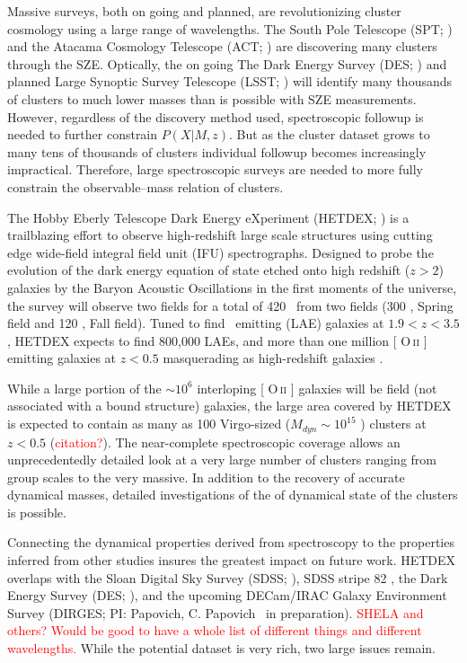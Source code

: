 \documentclass[apj, revtex4]{emulateapj}
\makeatletter
\newcommand{\editorial}[1]{\textcolor{red}{#1}}
\DeclareRobustCommand{\ion}[2]{%
\relax\ifmmode
\ifx\testbx\f@series
{\mathbf{#1\,\mathsc{#2}}}\else
{\mathrm{#1\,\mathsc{#2}}}\fi
\else\textup{#1\,{\mdseries\textsc{#2}}}%
\fi}
\makeatother
\begin{document}
Massive surveys, both on going and planned, are revolutionizing cluster cosmology using a large range of wavelengths. The South Pole Telescope (SPT; \citealt{Carlstrom2011}) and the Atacama Cosmology Telescope (ACT; \citealt{Swetz2011}) are discovering many clusters through the SZE. Optically, the on going The Dark Energy Survey (DES; \citealt{DES2005}) and planned Large Synoptic Survey Telescope (LSST; \citealt{LSST2012}) will identify many thousands of clusters to much lower masses than is possible with SZE measurements. However, regardless of the discovery method used, spectroscopic followup is needed to further constrain $P(X|M,z)$. But as the cluster dataset grows to many tens of thousands of clusters individual followup becomes increasingly impractical. Therefore, large spectroscopic surveys are needed to more fully constrain the observable--mass relation of clusters.

The Hobby Eberly Telescope Dark Energy eXperiment (HETDEX; \citealt{Hill2008}) is a trailblazing effort to observe high-redshift large scale structures using cutting edge wide-field integral field unit (IFU) spectrographs. Designed to probe the evolution of the dark energy equation of state etched onto high redshift ($z>2$) galaxies by the Baryon Acoustic Oscillations \citep{Eisenstein2005} in the first moments of the universe, the survey will observe two fields for a total of 420 \degsq\ from two fields (300 \degsq, Spring field and 120 \degsq, Fall field). Tuned to find \lya\ emitting (LAE) galaxies at $1.9<z<3.5$, HETDEX expects to find 800,000 LAEs, and more than one million [\ion{O}{ii}] emitting galaxies at $z<0.5$ masquerading as high-redshift galaxies \citep{Acquaviva2014}. 

While a large portion of the $\sim10^6$ interloping [\ion{O}{ii}] galaxies will be field (not associated with a bound structure) galaxies, the large area covered by HETDEX is expected to contain as many as 100 Virgo-sized ($M_{dyn}\sim 10^{15}$ \msol) clusters at $z<0.5$ (\editorial{citation?}). The near-complete spectroscopic coverage allows an unprecedentedly detailed look at a very large number of clusters ranging from group scales to the very massive. In addition to the recovery of accurate dynamical masses, detailed investigations of the of dynamical state of the clusters is possible. 

Connecting the dynamical properties derived from spectroscopy to the properties inferred from other studies insures the greatest impact on future work. HETDEX overlaps with the Sloan Digital Sky Survey (SDSS; \citealt{Blanton2001a}), SDSS stripe 82 \citep{Annis2014}, the Dark Energy Survey (DES; \citealt{DES2005}), and the upcoming DECam/IRAC Galaxy Environment Survey (DIRGES; PI: Papovich, C. Papovich \etal\ in preparation). \editorial{SHELA and others? Would be good to have a whole list of different things and different wavelengths.} While the potential dataset is very rich, two large issues remain.
\end{document}
